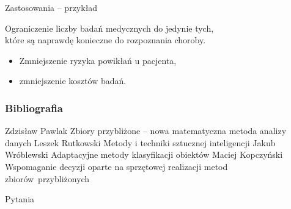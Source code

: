 \documentclass[10pt]{beamer}
\begin{document}
\begin{frame}{Zastosowania -- przykład}
\begin{spacing}{1.5}
Ograniczenie liczby badań medycznych do jedynie tych,\\które są naprawdę konieczne do rozpoznania choroby.

\begin{itemize}
\item Zmniejszenie ryzyka powikłań u pacjenta,
\item zmniejszenie kosztów badań.
\end{itemize}
\end{spacing}
\end{frame}



\begin{frame}
\frametitle{Bibliografia}
\footnotesize
{
\begin{thebibliography}{99}
 Zdzisław Pawlak
\newblock Zbiory przybliżone -- nowa matematyczna metoda analizy danych 
 Leszek Rutkowski
\newblock Metody i techniki sztucznej inteligencji
 Jakub Wróblewski
\newblock Adaptacyjne metody klasyfikacji obiektów
 Maciej Kopczyński
\newblock Wspomaganie decyzji oparte na sprzętowej realizacji metod zbiorów~przybliżonych
\end{thebibliography}
}
\end{frame}


{\1
\begin{frame}
  \finalpage
  {
  \begin{huge}
  	Pytania
  \end{huge}
  
  }
\end{frame}
}
\end{document}
